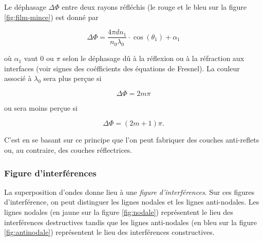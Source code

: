 Le déphasage $\Delta \Phi$ entre deux rayons
réfléchis (le rouge et le bleu sur la figure \ref{fig:film-mince})
est donné par

$$\Delta \Phi = \frac{4\pi dn_1}{n_0\lambda_0}\cdot\cos(\theta_1) + \alpha_1$$

où $\alpha_1$ vaut 0 ou $\pi$ selon le déphasage dû à la
réflexion ou à la réfraction aux interfaces (voir signes
des coéfficients des équations de Fresnel).
La couleur associé à $\lambda_0$ sera plus perçue si

$$\Delta \Phi = 2m\pi$$

ou sera moins perçue si

$$\Delta \Phi = (2m+1)\pi.$$

C'est en se basant sur ce principe que l'on peut
fabriquer des couches anti-reflets ou, au contraire,
des couches réflectrices.

\subsubsection{Figure d'interférences}
La superposition d'ondes donne lieu à une \emph{figure
d'interférences}. Sur ces figures d'interférence, on
peut distinguer les lignes nodales et les lignes anti-nodales.
Les lignes nodales (en jaune sur la figure \ref{fig:nodale})
représentent le lieu des interférences destructives tandis que
les lignes anti-nodales (en bleu sur la figure \ref{fig:antinodale})
représentent le lieu des interférences constructives.

